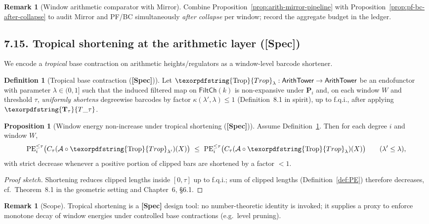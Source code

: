 \documentclass[11pt]{article}
\numberwithin{equation}{section}
\theoremstyle{plain}
\theoremstyle{definition}
\theoremstyle{remark}
\DeclareRobustCommand{\hyp}{\nobreakdash-}
\theoremstyle{plain}
\theoremstyle{definition}
\numberwithin{equation}{section}
\newtheorem{proposition}[theorem]{Proposition}
\theoremstyle{definition}
\newtheorem{definition}[theorem]{Definition}
\newtheorem{remark}[theorem]{Remark}
\DeclareRobustCommand{\FiltCh}[1]{\mathsf{FiltCh}(#1)}
\DeclareRobustCommand{\Ttau}{\texorpdfstring{\ensuremath{\mathbf{T}_{\tau}}}{T\_\tau}}
\DeclareRobustCommand{\Trop}{\texorpdfstring{\ensuremath{\operatorname{Trop}}}{Trop}}
\numberwithin{equation}{section}
\theoremstyle{plain}
\theoremstyle{definition}
\theoremstyle{remark}
\providecommand{\Tfun}[1]{\mathbf{T}_{#1}}
\providecommand{\Ttau}{\Tfun{\tau}}
\begin{document}
\begin{remark}[Window arithmetic comparator with Mirror]
Combine Proposition~\ref{prop:arith-mirror-pipeline} with Proposition~\ref{prop:pf-bc-after-collapse} to audit Mirror and PF/BC simultaneously \emph{after collapse} per window; record the aggregate budget in the ledger.
\end{remark}

\subsection*{7.15. Tropical shortening at the arithmetic layer (\textbf{[Spec]})}
We encode a \emph{tropical} base contraction on arithmetic heights/regulators as a window\hyp level barcode shortener.

\begin{definition}[Tropical base contraction (\textbf{[Spec]})]\label{def:tropical}
Let \(\Trop_\lambda:\mathsf{ArithTower}\to\mathsf{ArithTower}\) be an endofunctor with parameter \(\lambda\in(0,1]\) such that the induced filtered map on \(\FiltCh{k}\) is non\hyp expansive under \(\mathbf{P}_i\) and, on each window \(W\) and threshold \(\tau\), \emph{uniformly shortens} degreewise barcodes by factor \(\kappa(\lambda',\lambda)\le 1\) (Definition~8.1 in spirit), up to f.q.i., after applying \(\Ttau\).
\end{definition}

\begin{proposition}[Window energy non\hyp increase under tropical shortening (\textbf{[Spec]})]\label{prop:tropical-energy}
Assume Definition~\ref{def:tropical}. Then for each degree \(i\) and window \(W\),
\[
\mathrm{PE}_i^{\le\tau}\big(C_\tau (\mathcal{A}\circ \Trop_{\lambda'})(X)\big)\ \le\ \mathrm{PE}_i^{\le\tau}\big(C_\tau (\mathcal{A}\circ \Trop_{\lambda})(X)\big)\qquad (\lambda'\le \lambda),
\]
with strict decrease whenever a positive portion of clipped bars are shortened by a factor \(<1\).
\end{proposition}

\begin{proof}[Proof sketch]
Shortening reduces clipped lengths inside \([0,\tau]\) up to f.q.i.; sum of clipped lengths (Definition~\ref{def:PE}) therefore decreases, cf.\ Theorem~8.1 in the geometric setting and Chapter~6, §6.1.
\end{proof}

\begin{remark}[Scope]
Tropical shortening is a \textbf{[Spec]} design tool: no number\hyp theoretic identity is invoked; it supplies a proxy to enforce monotone decay of window energies under controlled base contractions (e.g.\ level pruning).
\end{remark}
\end{document}
